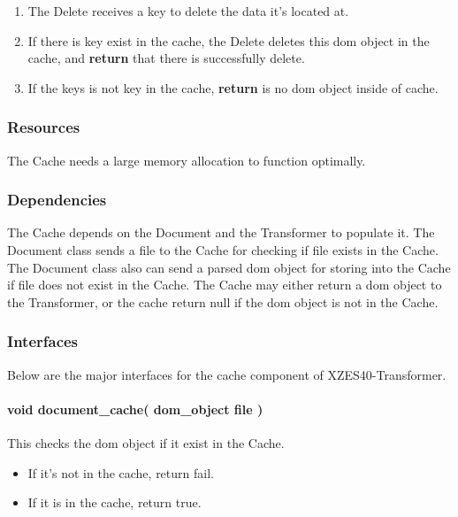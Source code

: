 \begin{enumerate}
    \item The Delete receives a key to delete the data it's located at.
    \item If there is key exist in the cache, the Delete deletes this \gls{dom} object in the cache, and \textbf{return} that there is successfully delete.
    \item If the keys is not key in the cache, \textbf{return} is no \gls{dom} object inside of cache.
\end{enumerate}

\subsubsection{Resources}

The Cache needs a large memory allocation to function optimally.

\subsubsection{Dependencies}

The Cache depends on the Document and the Transformer to populate it.
The Document class sends a file to the Cache for checking if file exists in the Cache.
The Document class also can send a parsed \gls{dom} object for storing into the Cache if file does not exist in the Cache.
The Cache may either return a \gls{dom} object to the Transformer, or the cache return null if the \gls{dom} object is not in the Cache.

\subsubsection{Interfaces}

Below are the major interfaces for the cache component of XZES40-Transformer.

\paragraph{void document\_cache( dom\_object file )} 
This checks the \gls{dom} object if it exist in the Cache.

\begin{itemize}
    \item If it's not in the cache, return fail. 
    \item If it is in the cache, return true.
\end{itemize}

